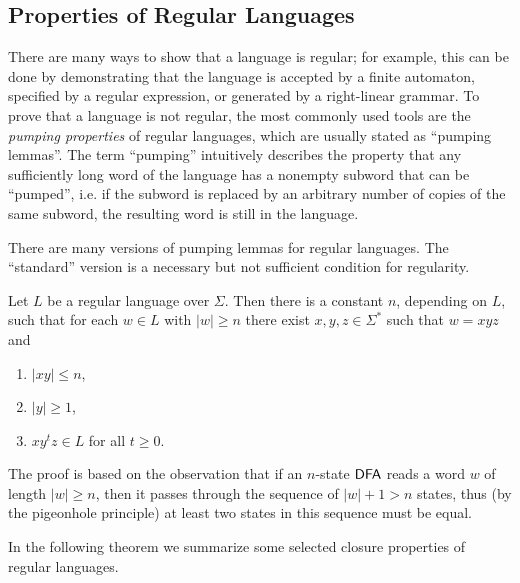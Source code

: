 \subsection{Properties of Regular Languages}
\label{subsection:properties-of-regular-languages}

There are many ways to show that a language is regular; for example, this can be done by demonstrating that the language is accepted by a finite automaton, specified by a regular expression, or generated by a right-linear grammar. To prove that a language is not regular, the most commonly used tools are the \emph{pumping properties} of regular languages, which are usually stated as ``pumping lemmas''. The term ``pumping'' intuitively describes the property that any sufficiently long word of the language has a nonempty subword that can be ``pumped'', i.e. if the subword is replaced by an arbitrary number of copies of the same subword, the resulting word is still in the language.

There are many versions of pumping lemmas for regular languages. The ``standard'' version is a necessary but not sufficient condition for regularity.

\begin{lemma}
Let $L$ be a regular language over $\Sigma$. Then there is a constant $n$, depending on $L$, such that for each $w \in L$ with $|w| \ge n$ there exist $x, y, z \in \Sigma^*$ such that $w = xyz$ and
\begin{enumerate}
\item $|xy| \le n$,
\item $|y| \ge 1$,
\item $x y^t z \in L$ for all $t \ge 0$.
\end{enumerate}
\end{lemma}

The proof is based on the observation that if an $n$-state $\DFA$ reads a word $w$ of length $|w| \ge n$, then it passes through the sequence of $|w| + 1 > n$ states, thus (by the pigeonhole principle) at least two states in this sequence must be equal.

In the following theorem we summarize some selected closure properties of regular languages.

